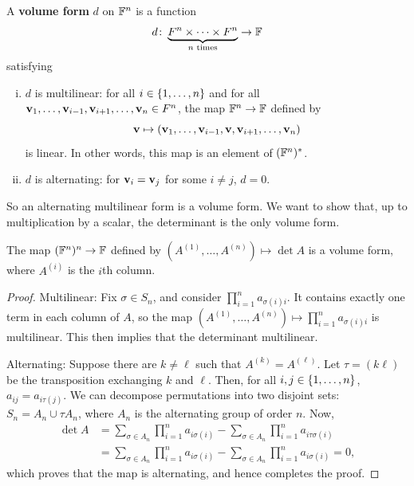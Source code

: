 \documentclass[a4paper]{article}
\begin{document}
\begin{definition}
	A \textbf{volume form} $ d $ on $ {\mathbb{F}}^n $ is a function 
	\[
		d \colon \underbrace{F^n \times \dots \times F^n}_{n \text{ times}} \to {\mathbb{F}}
	\]
	satisfying
	\begin{enumerate}[(i)]
		\item $ d $ is multilinear: for all $ i \in \qty{1, \dots, n} $ and for all $ {\bf v}_1, \dots, {\bf v}_{i-1}, {\bf v}_{i+1}, \dots, {\bf v}_n \in F^n $, the map $ {\mathbb{F}}^n \to {\mathbb{F}} $ defined by
		      \[
			      {\bf v} \mapsto ({\bf v}_1, \dots, {\bf v}_{i-1}, {\bf v}, {\bf v}_{i+1}, \dots, {\bf v}_n)
		      \]
		      is linear.
		      In other words, this map is an element of $ ({\mathbb{F}}^n)^* $.
		\item $ d $ is alternating: for $ {\bf v}_i = {\bf v}_j $ for some $ i \neq j $, $ d = 0 $.
	\end{enumerate}
\end{definition}

So an alternating multilinear form is a volume form.
We want to show that, up to multiplication by a scalar, the determinant is the only volume form.

\begin{lemma}
	The map $ ({\mathbb{F}}^n)^n \to {\mathbb{F}} $ defined by $ (A^{(1)}, \dots, A^{(n)}) \mapsto \det A $ is a volume form, where $ A^{(i)} $ is the $i$th column.
\end{lemma}
\begin{proof}
	Multilinear: 
	Fix $ \sigma \in S_n $, and consider $ \prod_{i=1}^n a_{\sigma(i) i} $.
	It contains exactly one term in each column of $ A $,
	so the map $ (A^{(1)}, \dots, A^{(n)}) \mapsto \prod_{i=1}^n a_{\sigma(i) i} $ is multilinear.
	This then implies that the determinant multilinear.

	Alternating:
	Suppose there are $k\neq \ell$ such that $ A^{(k)} = A^{(\ell)} $. 
	Let $ \tau = ( k \ell ) $ be the transposition exchanging $ k $ and $ \ell $.
	Then, for all $ i, j \in \qty{1, \dots, n} $, $ a_{ij} = a_{i \tau(j)} $.
	We can decompose permutations into two disjoint sets: $ S_n = A_n \cup \tau A_n $, where $ A_n $ is the alternating group of order $ n $.
	Now, 
	\begin{align*}
		\det A &= \sum_{\sigma\in A_n} \prod_{i=1}^{n} a_{i \sigma(i)} - \sum_{\sigma\in A_n} \prod_{i=1}^{n} a_{i \tau\sigma(i)}\\ 
		&= \sum_{\sigma\in A_n} \prod_{i=1}^{n} a_{i \sigma(i)} - \sum_{\sigma\in A_n} \prod_{i=1}^{n} a_{i \sigma(i)} = 0,
	\end{align*}
	which proves that the map is alternating, and hence completes the proof. 
\end{proof}
\end{document}
